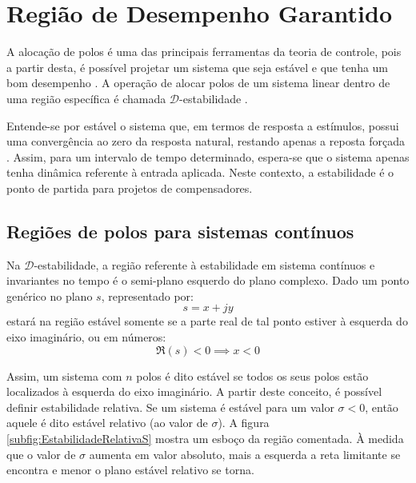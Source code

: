 \chapter{Região de Desempenho Garantido}

A alocação de polos é uma das principais ferramentas da teoria de controle, pois a partir desta, é possível projetar um sistema que seja estável e que tenha um bom desempenho \cite{ROSINOVA2014}. A operação de alocar polos de um sistema linear dentro de uma região específica é chamada $\mathscr{D}$-estabilidade \cite{WISNIEWSKI2017}.

Entende-se por estável o sistema que, em termos de resposta a estímulos, possui uma convergência ao zero da resposta natural, restando apenas a reposta forçada \cite{NISE2011}. Assim, para um intervalo de tempo determinado, espera-se que o sistema apenas tenha dinâmica referente à entrada aplicada. Neste contexto, a estabilidade é o ponto de partida para projetos de compensadores.

\section{Regiões de polos para sistemas contínuos}

Na $\mathscr{D}$-estabilidade, a região referente à estabilidade em sistema contínuos e invariantes no tempo é o semi-plano esquerdo do plano complexo. Dado um ponto genérico no plano $s$, representado por:
\begin{equation}
  s = x + jy\label{eq:PontoGenericoPlanoS}
\end{equation}
estará na região estável somente se a parte real de tal ponto estiver à esquerda do eixo imaginário, ou em números:
\begin{equation}
  \Re{(s)} < 0 \implies x < 0
\end{equation}

Assim, um sistema com $n$ polos é dito estável se todos os seus polos estão localizados à esquerda do eixo imaginário. A partir deste conceito, é possível definir estabilidade relativa. Se um sistema é estável para um valor $\sigma < 0$, então aquele é dito estável relativo (ao valor de $\sigma$). A figura \ref{subfig:EstabilidadeRelativaS} mostra um esboço da região comentada. À medida que o valor de $\sigma$ aumenta em valor absoluto, mais a esquerda a reta limitante se encontra e menor o plano estável relativo se torna.

